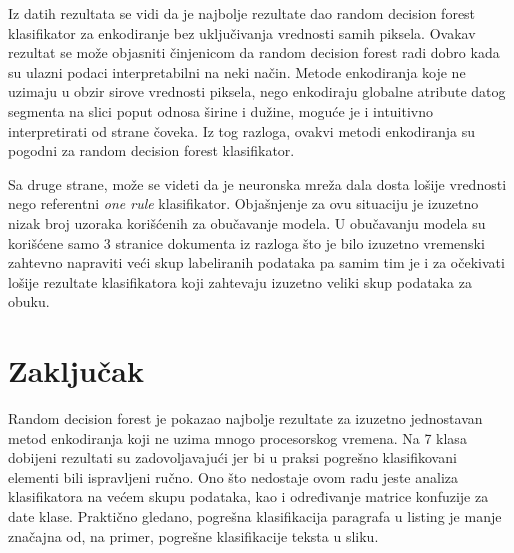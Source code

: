 \documentclass[]{amsart}
\begin{document}
Iz datih rezultata se vidi da je najbolje rezultate dao random decision forest klasifikator za enkodiranje bez uključivanja vrednosti samih piksela. Ovakav
rezultat se može objasniti činjenicom da random decision forest radi dobro kada su ulazni podaci interpretabilni na neki način. 
Metode enkodiranja koje ne uzimaju u obzir sirove vrednosti piksela, nego enkodiraju globalne atribute datog segmenta
na slici poput odnosa širine i dužine, moguće je i intuitivno interpretirati od strane čoveka. Iz tog razloga, ovakvi metodi enkodiranja su pogodni za random decision forest klasifikator.


Sa druge strane, može se videti da je neuronska mreža dala dosta lošije vrednosti nego referentni \textit{one rule} klasifikator. Objašnjenje za ovu situaciju je
izuzetno nizak broj uzoraka korišćenih za obučavanje modela. U obučavanju modela su korišćene samo 3 stranice dokumenta iz razloga što je bilo izuzetno vremenski
zahtevno  napraviti veći skup labeliranih podataka pa samim tim je i za očekivati lošije rezultate klasifikatora koji zahtevaju izuzetno veliki skup podataka
za obuku.



\section{Zaključak}
\label{sec:orge359279}

Random decision forest je pokazao najbolje rezultate za izuzetno jednostavan metod enkodiranja koji ne uzima mnogo procesorskog vremena. Na 7 klasa dobijeni
rezultati su zadovoljavajući jer bi u praksi pogrešno klasifikovani elementi bili ispravljeni ručno. Ono što nedostaje ovom radu jeste
analiza klasifikatora na većem skupu podataka, kao i određivanje matrice konfuzije za date klase. Praktično gledano, pogrešna klasifikacija paragrafa u listing je manje
značajna od, na primer, pogrešne klasifikacije teksta u sliku.





\end{document}
